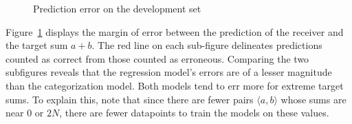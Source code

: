 \documentclass[twocolumn]{article}
\begin{document}
\begin{figure}[ht]
    \centering
    
    \caption{Prediction error on the development set}
    \label{fig:error}
\end{figure}

Figure~\ref{fig:error} displays the margin of error between the prediction of the receiver and the target sum $a+b$.
The red line on each sub-figure delineates predictions counted as correct from those counted as erroneous.
Comparing the two subfigures reveals that the regression model's errors are of a lesser magnitude than the categorization model.
Both models tend to err more for extreme target sums.
To explain this, note that since there are fewer pairs $\langle a,b \rangle$ whose sums are near 0 or $2N$, there are fewer datapoints to train the models on these values.
\end{document}
